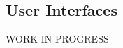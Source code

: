 \documentclass[../../../rasd.tex]{subfiles}
\begin{document}
\subsection{User Interfaces}
			WORK IN PROGRESS
\end{document}
